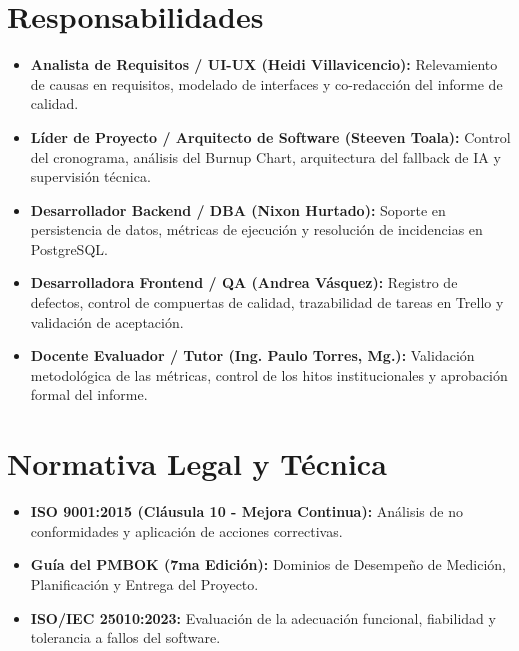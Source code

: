 \documentclass[12pt,a4paper]{article}
\begin{document}
\section{Responsabilidades}
\begin{itemize}[leftmargin=1.5em, itemsep=2pt]
    \item \textbf{Analista de Requisitos / UI-UX (Heidi Villavicencio):} Relevamiento de causas en requisitos, modelado de interfaces y co-redacción del informe de calidad.
    \item \textbf{Líder de Proyecto / Arquitecto de Software (Steeven Toala):} Control del cronograma, análisis del Burnup Chart, arquitectura del fallback de IA y supervisión técnica.
    \item \textbf{Desarrollador Backend / DBA (Nixon Hurtado):} Soporte en persistencia de datos, métricas de ejecución y resolución de incidencias en PostgreSQL.
    \item \textbf{Desarrolladora Frontend / QA (Andrea Vásquez):} Registro de defectos, control de compuertas de calidad, trazabilidad de tareas en Trello y validación de aceptación.
    \item \textbf{Docente Evaluador / Tutor (Ing. Paulo Torres, Mg.):} Validación metodológica de las métricas, control de los hitos institucionales y aprobación formal del informe.
\end{itemize}

\section{Normativa Legal y Técnica}
\begin{itemize}[leftmargin=1.5em, itemsep=2pt]
    \item \textbf{ISO 9001:2015 (Cláusula 10 - Mejora Continua):} Análisis de no conformidades y aplicación de acciones correctivas.
    \item \textbf{Guía del PMBOK (7ma Edición):} Dominios de Desempeño de Medición, Planificación y Entrega del Proyecto.
    \item \textbf{ISO/IEC 25010:2023:} Evaluación de la adecuación funcional, fiabilidad y tolerancia a fallos del software.
\end{itemize}
\end{document}
